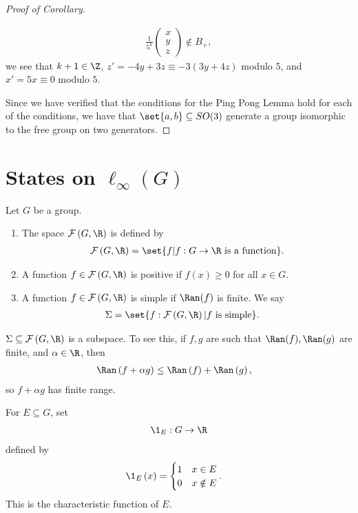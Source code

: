 \documentclass[10pt]{mypackage}
\begin{document}
\begin{proof}[Proof of Corollary]
\begin{enumerate}[(1)]
      \begin{align*}
        \frac{1}{5^{k}} \begin{pmatrix}x\\y\\z\end{pmatrix}\notin B_{+},
      \end{align*}
      we see that $k+1\in \Z$, $z' = -4y + 3z \equiv -3\left(3y + 4z\right)$ modulo $5$, and $x' = 5x \equiv 0$ modulo $5$.
  \end{enumerate}
  Since we have verified that the conditions for the Ping Pong Lemma hold for each of the conditions, we have that $\set{a,b}\subseteq SO(3)$ generate a group isomorphic to the free group on two generators.
\end{proof}
\section{States on $\ell_{\infty}(G)$}%
\begin{definition}
  Let $G$ be a group.
  \begin{enumerate}[(1)]
    \item The space $\mathcal{F}\left(G,\R\right)$ is defined by
      \begin{align*}
        \mathcal{F}\left(G,\R\right) = \set{f | f: G\rightarrow \R\text{ is a function}}.
      \end{align*}
    \item A function $f\in \mathcal{F}\left(G,\R\right)$ is positive if $f(x) \geq 0$ for all $x\in G$.
    \item A function $f\in \mathcal{F}\left(G,\R\right)$ is simple if $\Ran(f)$ is finite. We say
      \begin{align*}
        \Sigma &= \set{f: \mathcal{F}\left(G,\R\right) | f\text{ is simple}}.
      \end{align*}
  \end{enumerate}
\end{definition}
\begin{fact}
  $\Sigma\subseteq \mathcal{F}\left(G,\R\right)$ is a subspace. To see this, if $f,g$ are such that $\Ran(f),\Ran(g)$ are finite, and $\alpha \in \R$, then
  \begin{align*}
    \Ran\left(f + \alpha g\right) &\leq \Ran\left(f\right) + \Ran\left(g\right),
  \end{align*}
  so $f + \alpha g$ has finite range.
\end{fact}
\begin{definition}
  For $E\subseteq G$, set
  \begin{align*}
    \1_{E}: G\rightarrow \R
  \end{align*}
  defined by
  \begin{align*}
    \1_{E}\left(x\right) &= \begin{cases}
      1 & x\in E\\
      0 & x\notin E
    \end{cases}.
  \end{align*}
  This is the characteristic function of $E$.
\end{definition}
\end{document}

